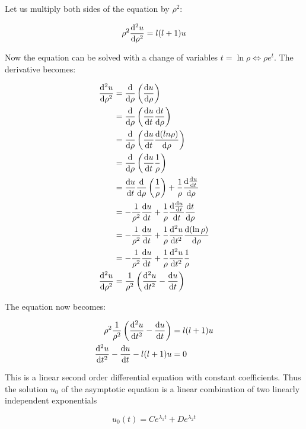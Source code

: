 \documentclass{article}
\begin{document}
    Let us multiply both sides of the equation by $\rho^2$:

    \begin{equation}
        \rho^2 \odv[order = 2]{u}{\rho} = l(l + 1)u
    \end{equation}

    Now the equation can be solved with a change of variables $t = \ln\rho \iff \rho e^{t}$. The derivative becomes:

    \begin{align}
        \odv[order = 2]{u}{\rho} &= \odv{}{\rho}\left( \odv{u}{\rho} \right) \\
        &= \odv{}{\rho}\left( \odv{u}{t}\odv{t}{\rho} \right) \\
        &= \odv{}{\rho}\left( \odv{u}{t}\odv{(ln \rho)}{\rho} \right) \\
        &= \odv{}{\rho}\left( \odv{u}{t}\frac{1}{\rho} \right) \\
        &= \odv{u}{t} \odv{}{\rho}\left(\frac{1}{\rho} \right) + \frac{1}{\rho}\odv{\odv{u}{t}}{\rho} \\
        &= -\frac{1}{\rho^2}\odv{u}{t} + \frac{1}{\rho}\odv{\odv{u}{t}}{t}\odv{t}{\rho} \\
        &= -\frac{1}{\rho^2}\odv{u}{t} + \frac{1}{\rho}\odv[order = 2]{u}{t}\odv{(\ln \rho)}{\rho} \\
        &= -\frac{1}{\rho^2}\odv{u}{t} + \frac{1}{\rho}\odv[order = 2]{u}{t}\frac{1}{\rho} \\
        \odv[order = 2]{u}{\rho} &= \frac{1}{\rho^2}\left(\odv[order = 2]{u}{t} - \odv{u}{t}\right)
    \end{align}

    The equation now becomes:

    \begin{align}
        \rho^2\frac{1}{\rho^2}\left( \odv[order = 2]{u}{t} - \odv{u}{t} \right) &= l(l + 1)u \\
        \odv[order = 2]{u}{t} - \odv{u}{t} - l(l + 1)u &= 0
    \end{align}

    This is a linear second order differential equation with constant coefficients. Thus the solution $u_0$ of the asymptotic equation is a linear combination of two linearly independent exponentials

    \begin{equation}
        u_{0}(t) = Ce^{\lambda_1 t} + De^{\lambda_2 t}
    \end{equation}
\end{document}
